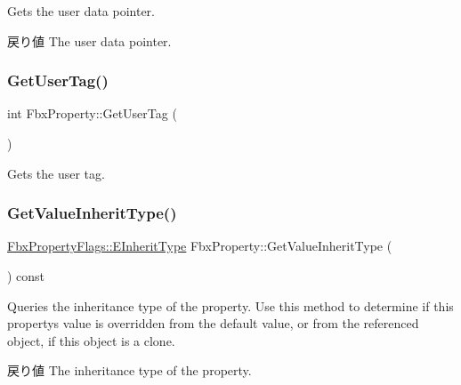 Gets the user data pointer. \begin{DoxyReturn}{戻り値}
The user data pointer. 
\end{DoxyReturn}
\mbox{\label{class_fbx_property_a346536ecdb6cc2178105ed4fc30b80fc}} 
\subsubsection{\texorpdfstring{Get\+User\+Tag()}{GetUserTag()}}
{\footnotesize\ttfamily int Fbx\+Property\+::\+Get\+User\+Tag (\begin{DoxyParamCaption}{ }\end{DoxyParamCaption})}



Gets the user tag. 

\mbox{\label{class_fbx_property_aee557d7603e73430d4034a03b631b75e}} 
\subsubsection{\texorpdfstring{Get\+Value\+Inherit\+Type()}{GetValueInheritType()}}
{\footnotesize\ttfamily \hyperlink{class_fbx_property_flags_ae3b667a4fcac4b827fa186a698fec2f8}{Fbx\+Property\+Flags\+::\+E\+Inherit\+Type} Fbx\+Property\+::\+Get\+Value\+Inherit\+Type (\begin{DoxyParamCaption}{ }\end{DoxyParamCaption}) const}

Queries the inheritance type of the property. Use this method to determine if this property\textquotesingle{}s value is overridden from the default value, or from the referenced object, if this object is a clone. \begin{DoxyReturn}{戻り値}
The inheritance type of the property. 
\end{DoxyReturn}
\mbox{\label{class_fbx_property_aa040d85cda5816e4937a348e47357a61}} 
